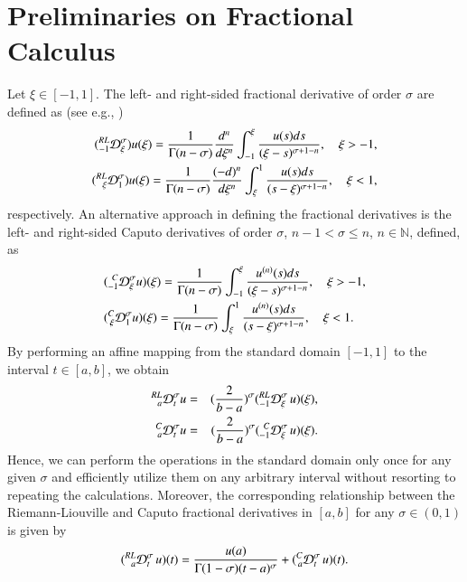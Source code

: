 
%
\section{Preliminaries on Fractional Calculus}
\label{Sec: Fractional Calculus}
%

Let $ \xi \in [-1,1]$. The left- and right-sided fractional derivative of order $\sigma$ are defined as (see e.g., \cite{Miller93, Podlubny99})
%
\begin{align}
\label{Eq: left RL derivative}
%
(\prescript{RL}{-1}{\mathcal{D}}_{\xi}^{\sigma}) u(\xi) = \frac{1}{\Gamma(n-\sigma)}  \frac{d^{n}}{d\xi^n} \int_{-1}^{\xi} \frac{u(s) ds}{(\xi - s)^{\sigma+1-n} },\quad \xi >-1 ,
%
\\
\label{Eq: right RL derivative}
%
(\prescript{RL}{\xi}{\mathcal{D}}_{1}^{\sigma}) u(\xi) = \frac{1}{\Gamma(n-\sigma)}  \frac{(-d)^{n}}{d\xi^n} \int_{\xi}^{1} \frac{u(s) ds}{(s - \xi)^{\sigma+1-n} },\quad \xi < 1 ,
%
\end{align}
%
respectively. 
%
An alternative approach in defining the fractional derivatives is the left- and right-sided Caputo derivatives of order $\sigma$, $n-1 < \sigma \leq n$, $n \in \mathbb{N}$, defined, as
%
\begin{align}
\label{Eq: left Caputo derivative}
%
&
(\prescript{C}{-1}{\mathcal{D}}_{\xi}^{\sigma} u) (\xi) = \frac{1}{\Gamma(n-\sigma)}  \int_{-1}^{\xi} \frac{u^{(n)}(s) ds}{(\xi - s)^{\sigma+1-n} },\quad \xi>-1,
\\
\label{Eq: right Caputo derivative}
%
&
(\prescript{C}{\xi}{\mathcal{D}}_{1}^{\sigma} u) (\xi) =  \frac{1}{\Gamma(n-\sigma)}  \int_{\xi}^{1} \frac{u^{(n)}(s) ds}{(s-\xi)^{\sigma+1-n} },\quad \xi<1.
%
\end{align}
%
By performing an affine mapping from the standard domain $[-1,1]$ to the interval $t \in [a,b]$, we obtain
%
\begin{eqnarray}
\label{Eq: RL in xL-xR}
%
\prescript{RL}{a}{\mathcal{D}}_{t}^{\sigma} u  &=&  (\frac{2}{b-a})^\sigma (\prescript{RL}{-1}{\mathcal{D}}_{\xi}^{\sigma} \, u )(\xi), 
\\ 
\label{Eq: Caputo in xL-xR}
\prescript{C}{a}{\mathcal{D}}_{t}^{\sigma} u  &=&  (\frac{2}{b-a})^\sigma (\prescript{C}{-1}{\mathcal{D}}_{\xi}^{\sigma} \, u) (\xi).
%
\end{eqnarray} 
%
Hence, we can perform the operations in the standard domain only once for any given $\sigma$ and efficiently utilize them on any arbitrary interval without resorting to repeating the calculations. Moreover, the corresponding relationship between the Riemann-Liouville and Caputo fractional derivatives in $[a,b]$ for any $\sigma \in (0,1)$ is given by 
%
\begin{equation}
\label{Eq:  Caputo vs. Riemann}
(\prescript{RL}{a}{\mathcal{D}}_{t}^{\sigma} \, u) (t)  =  \frac{ u(a)}{\Gamma(1-\sigma) (t-a)^{\sigma}}  +   (\prescript{C}{a}{\mathcal{D}}_{t}^{\sigma} \, u) (t).
\end{equation}
%











